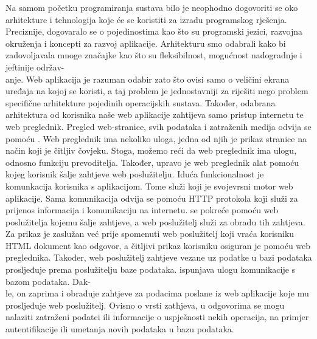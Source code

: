 	Na samom početku programiranja sustava bilo je neophodno dogovoriti se oko arhitekture i tehnologija koje će se koristiti za izradu programskog rješenja. Preciznije, dogovaralo se o pojedinostima kao što su programski jezici, razvojna okruženja i koncepti za razvoj aplikacije. Arhitekturu smo odabrali kako bi zadovoljavala mnoge značajke kao što su fleksibilnost, mogućnost nadogradnje i jeftinije održav-\\anje. Web aplikacija je razuman odabir zato što ovisi samo o veličini ekrana uređaja na kojoj se koristi, a taj problem je jednostavniji za riješiti nego problem specifične arhitekture pojedinih operacijskih sustava. Također, odabrana arhitektura od korisnika naše web aplikacije zahtijeva samo pristup internetu te web preglednik.  \newline
	\indent Pregled web-stranice, svih podataka i zatraženih medija odvija se pomoću \linebreak {}. Web preglednik ima nekoliko uloga, jedna od njih je prikaz stranice na način koji je čitljiv čovjeku. Stoga, možemo reći da web preglednik ima ulogu, odnosno funkciju prevoditelja. Također, upravo je web preglednik alat pomoću kojeg korisnik šalje zahtjeve web poslužitelju. \newline
	\indent Iduća funkcionalnost je komunkacija korisnika s aplikacijom. Tome služi \linebreak {} koji je svojevrsni motor web aplikacije. Sama komunikacija odvija se pomoću HTTP protokola koji služi za prijenos informacija i komunikaciju na internetu. \newline
	\indent {} se pokreće pomoću web poslužitelja kojemu šalje zahtjeve, a web poslužitelj služi za obradu tih zahtjeva. Za prikaz je zaslužan već prije spomenuti web poslužitelj koji vraća korisniku HTML dokument kao odgovor, a čitljivi prikaz korisniku osiguran je pomoću web preglednika. Također, web poslužitelj zahtjeve vezane uz podatke u bazi podataka prosljeđuje prema poslužitelju baze podataka. \newline
	\indent {} ispunjava ulogu komunikacije s bazom podataka. Dak-\\le, on zaprima i obrađuje zahtjeve za podacima poslane iz web aplikacije koje mu prosljeđuje web poslužitelj. Ovisno o vrsti zathjeva, u odgovorima se mogu nalaziti zatraženi podatci ili informacije o uspješnosti nekih operacija, na primjer autentifikacije ili umetanja novih podataka u bazu podataka.\newline
